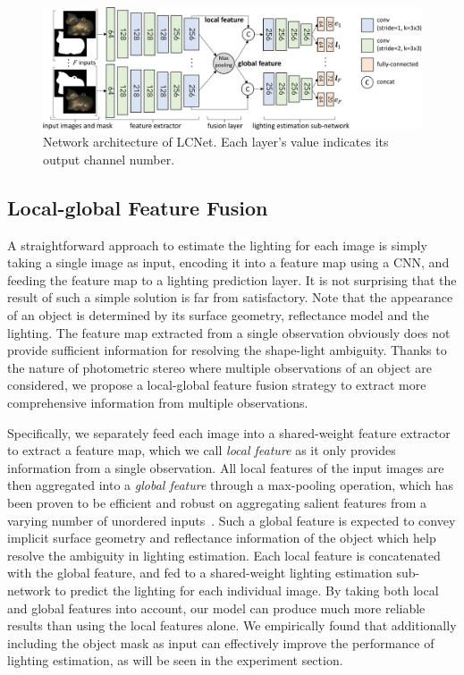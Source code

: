\begin{figure}[htbp] \centering
	\includegraphics[width=1\textwidth]{ch-gcnet/images/Method/LCNet.pdf}
    \caption[Network architecture of LCNet]{Network architecture of LCNet. Each layer's value indicates its output channel number.} \label{fig:LCNet}
\end{figure}

\subsection{Local-global Feature Fusion}
A straightforward approach to estimate the lighting for each image is simply taking a single image as input, encoding it into a feature map using a CNN, and feeding the feature map to a lighting prediction layer. It is not surprising that the result of such a simple solution is far from satisfactory. Note that the appearance of an object is determined by its surface geometry, reflectance model and the lighting. The feature map extracted from a single observation obviously does not provide sufficient information for resolving the shape-light ambiguity. Thanks to the nature of photometric stereo where multiple observations of an object are considered, we propose a local-global feature fusion strategy to extract more comprehensive information from multiple observations.

Specifically, we separately feed each image into a shared-weight feature extractor to extract a feature map, which we call \emph{local feature} as it only provides information from a single observation. All local features of the input images are then aggregated into a \emph{global feature} through a max-pooling operation, which has been proven to be efficient and robust on aggregating salient features from a varying number of unordered inputs~\cite{wiles2017silnet,chen2018ps}. Such a global feature is expected to convey implicit surface geometry and reflectance information of the object which help resolve the ambiguity in lighting estimation. Each local feature is concatenated with the global feature, and fed to a shared-weight lighting estimation sub-network to predict the lighting for each individual image. By taking both local and global features into account, our model can produce much more reliable results than using the local features alone. We empirically found that additionally including the object mask as input can effectively improve the performance of lighting estimation, as will be seen in the experiment section.

